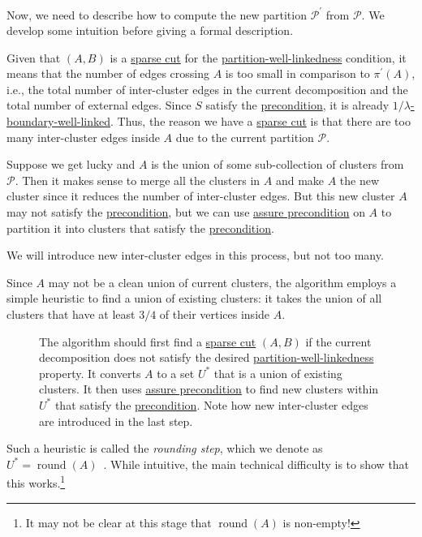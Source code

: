 Now, we need to describe how to compute the new partition \(\mathcal{P} ^{\prime} \) from \(\mathcal{P} \). We develop some intuition before giving a formal description.

\begin{intuition}
	Given that \((A, B)\) is a \hyperref[prb:non-uniform-sparsest-cut]{sparse cut} for the \hyperref[def:partition-and-boundary-well-linked]{partition-well-linkedness} condition, it means that the number of edges crossing \(A\) is too small in comparison to \(\pi ^{\prime} (A)\), i.e., the total number of inter-cluster edges in the current decomposition and the total number of external edges. Since \(S\) satisfy the \hyperref[def:precondition]{precondition}, it is already \hyperref[def:boundary-well-linked]{\(1 / \lambda \)-boundary-well-linked}. Thus, the reason we have a \hyperref[prb:non-uniform-sparsest-cut]{sparse cut} is that there are too many inter-cluster edges inside \(A\) due to the current partition \(\mathcal{P} \).

	Suppose we get lucky and \(A\) is the union of some sub-collection of clusters from \(\mathcal{P} \). Then it makes sense to merge all the clusters in \(A\) and make \(A\) the new cluster since it reduces the number of inter-cluster edges. But this new cluster \(A\) may not satisfy the \hyperref[def:precondition]{precondition}, but we can use \hyperref[algo:assure-precondition]{assure precondition} on \(A\) to partition it into clusters that satisfy the \hyperref[def:precondition]{precondition}.

	\begin{remark}
		We will introduce new inter-cluster edges in this process, but not too many.
	\end{remark}

	Since \(A\) may not be a clean union of current clusters, the algorithm employs a simple heuristic to find a union of existing clusters: it takes the union of all clusters that have at least \(3 / 4\) of their vertices inside \(A\).

	\begin{figure}[H]
		\centering
		\caption{The algorithm should first find a \hyperref[prb:non-uniform-sparsest-cut]{sparse cut} \((A, B)\) if the current decomposition does not satisfy the desired \hyperref[def:partition-and-boundary-well-linked]{partition-well-linkedness} property. It converts \(A\) to a set \(U^{\ast} \) that is a union of existing clusters. It then uses \hyperref[algo:assure-precondition]{assure precondition} to find new clusters within \(U^{\ast} \) that satisfy the \hyperref[def:precondition]{precondition}. Note how new inter-cluster edges are introduced in the last step.}
		\label{fig:partition}
	\end{figure}
	Such a heuristic is called the \emph{rounding step}, which we denote as \(U^{\ast} = \operatorname{round}(A) \)~\cite{abraham2008nearly}. While intuitive, the main technical difficulty is to show that this works.\footnote{It may not be clear at this stage that \(\operatorname{round}(A) \) is non-empty!}
\end{intuition}

